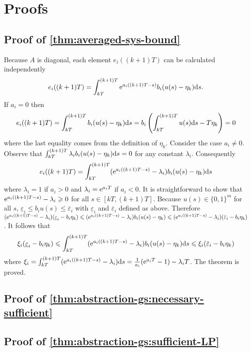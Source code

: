\section{Proofs}

\subsection{Proof of \protect\cref{thm:averaged-sys-bound}}
\label{sec:proof:averaged-sys-bound}

  Because $A$ is diagonal, each element $e_i ((k + 1) T)$ can be calculated
  independently
  \[ e_i ((k + 1) T) = \int_{kT}^{(k + 1) T} \mathrm{e}^{a_i ((k + 1) T - s)} b_i 
     (u (s) - \eta_k) \mathrm{d} s \text{.} \]
  If $a_i = 0$ then
  \[ e_i ((k + 1) T) = \int_{kT}^{(k + 1) T} b_i  (u (s) - \eta_k) \mathrm{d} s =
     b_i  \left( \int_{kT}^{(k + 1) T} u (s) \mathrm{d} s - T \eta_k \right) = 0
  \]
  where the last equality comes from the definition of $\eta_k$. Consider the
  case $a_i \neq 0$. Observe that $\int_{kT}^{(k + 1) T} \lambda_i b_i  (u (s)
  - \eta_k) \mathrm{d} s = 0$ for any constant $\lambda_i$. Consequently
  \[ e_i ((k + 1) T) = \int_{kT}^{(k + 1) T} (\mathrm{e}^{a_i ((k + 1) T - s)} -
     \lambda_i ) b_i  (u (s) - \eta_k) \mathrm{d} s \]
  where $\lambda_i = 1$ if $a_i > 0$ and $\lambda_i = \mathrm{e}^{a_i T}$ if $a_i
  < 0$. It is straightforward to show that $\mathrm{e}^{a_i ((k + 1) T - s)} -
  \lambda_i \geqslant 0$ for all $s \in [kT, (k + 1) T]$. Because $u (s) \in
  \{ 0, 1 \}^m$ for all $s$, $\underline{\varepsilon}_i \leqslant b_i u (s)
  \leqslant \overbar{\varepsilon}_i$ with $\underline{\varepsilon}_i$ and
  $\overbar{\varepsilon}_i$ defined as above. Therefore $(\mathe^{a_i ((k +
  1) T - s)} - \lambda_i )  (\underline{\varepsilon}_i - b_i \eta_k) \leqslant
  (\mathe^{a_i ((k + 1) T - s)} - \lambda_i ) b_i  (u (s) - \eta_k) \leqslant
  (\mathe^{a_i ((k + 1) T - s)} - \lambda_i )  (\overbar{\varepsilon}_i - b_i
  \eta_k)$. It follows that
  \[ \xi_i  (\underline{\varepsilon}_i - b_i \eta_k) \leqslant \int_{kT}^{(k +
     1) T} (\mathe^{a_i ((k + 1) T - s)} - \lambda_i ) b_i  (u (s) - \eta_k)
     \mathd s \leqslant \xi_i  (\overbar{\varepsilon}_i - b_i \eta_k) \]
  where $\xi_i = \int_{kT}^{(k + 1) T} (\mathrm{e}^{a_i ((k + 1) T - s)} -
  \lambda_i ) \mathrm{d} s = \frac{1}{a_i} (\mathrm{e}^{a_i T} - 1) - \lambda_i T$.
  The theorem is proved.

\subsection{Proof of \protect\cref{thm:abstraction-gs:necessary-sufficient}}
\label{sec:proof:abstraction-gs:necessary-sufficient}


\subsection{Proof of \protect\cref{thm:abstraction-gs:sufficient-LP}}
\label{sec:proofs:abstraction-gs:sufficient-LP}




